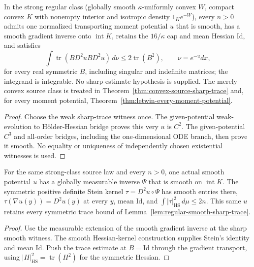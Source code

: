 \begin{lemma}
  \label{lem:regular-smooth-sharp-trace}
  \leanok
  In the strong regular class (globally smooth $\kappa$-uniformly convex $W$, compact convex
  $K$ with nonempty interior and isotropic density $1_K e^{-W}$), every $n>0$ admits one
  normalized transporting moment potential $u$ that is smooth, has a smooth gradient inverse
  onto $\operatorname{int}K$, retains the $16/\kappa$ cap and mean Hessian $\mathrm{Id}$, and satisfies
  \[
    \int\operatorname{tr}(B D^2u B D^2u)\,d\nu\le2\operatorname{tr}(B^2),
    \qquad \nu=e^{-u}dx,
  \]
  for every real symmetric $B$, including singular and indefinite matrices; the integrand
  is integrable. No sharp-estimate hypothesis is supplied. The merely convex source class is
  treated in Theorem~\ref{thm:convex-source-sharp-trace} and, for every moment potential,
  Theorem~\ref{thm:letwin-every-moment-potential}.
\end{lemma}
\begin{proof}
  \leanok
  Choose the weak sharp-trace witness once. The given-potential weak-evolution to H\"older-Hessian
  bridge proves this very $u$ is $C^2$. The given-potential $C^3$ and all-order bridges,
  including the one-dimensional ODE branch, then prove it smooth. No equality or uniqueness
  of independently chosen existential witnesses is used.
\end{proof}

\begin{lemma}
  \label{lem:regular-smooth-stein-l2}
  \leanok
  For the same strong-class source law and every $n>0$, one actual smooth potential $u$
  has a globally measurable inverse $\Psi$ that is smooth on $\operatorname{int}K$.
  The symmetric positive definite Stein kernel $\tau=D^2u\circ\Psi$ has smooth entries there,
  $\tau(\nabla u(y))=D^2u(y)$ at every $y$, mean $\mathrm{Id}$, and
  $\int|\tau|_{\mathrm{HS}}^2\,d\mu\le2n$. This same $u$ retains every symmetric trace bound
  of Lemma~\ref{lem:regular-smooth-sharp-trace}.
\end{lemma}
\begin{proof}
  \leanok
  Use the measurable extension of the smooth gradient inverse at the sharp smooth witness.
  The smooth Hessian-kernel construction supplies Stein's identity and mean $\mathrm{Id}$.
  Push the trace estimate at $B=\mathrm{Id}$ through the gradient transport, using
  $|H|_{\mathrm{HS}}^2=\operatorname{tr}(H^2)$ for the symmetric Hessian.
\end{proof}

